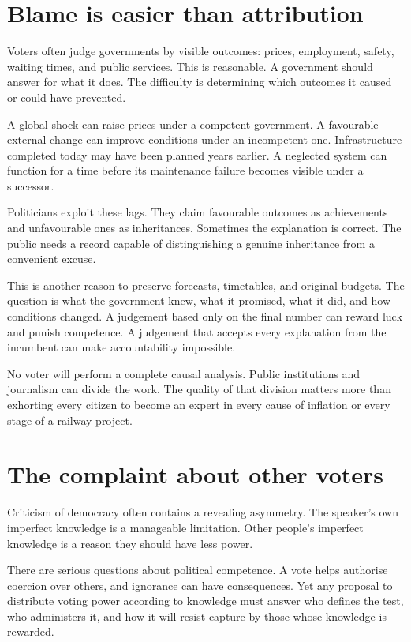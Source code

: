 \documentclass[12pt,a4paper]{book}
\begin{document}
\section*{Blame is easier than attribution}

Voters often judge governments by visible outcomes: prices, employment, safety, waiting times, and public services. This is reasonable. A government should answer for what it does. The difficulty is determining which outcomes it caused or could have prevented.

A global shock can raise prices under a competent government. A favourable external change can improve conditions under an incompetent one. Infrastructure completed today may have been planned years earlier. A neglected system can function for a time before its maintenance failure becomes visible under a successor.

Politicians exploit these lags. They claim favourable outcomes as achievements and unfavourable ones as inheritances. Sometimes the explanation is correct. The public needs a record capable of distinguishing a genuine inheritance from a convenient excuse.

This is another reason to preserve forecasts, timetables, and original budgets. The question is what the government knew, what it promised, what it did, and how conditions changed. A judgement based only on the final number can reward luck and punish competence. A judgement that accepts every explanation from the incumbent can make accountability impossible.

No voter will perform a complete causal analysis. Public institutions and journalism can divide the work. The quality of that division matters more than exhorting every citizen to become an expert in every cause of inflation or every stage of a railway project.

\section*{The complaint about other voters}

Criticism of democracy often contains a revealing asymmetry. The speaker's own imperfect knowledge is a manageable limitation. Other people's imperfect knowledge is a reason they should have less power.

There are serious questions about political competence. A vote helps authorise coercion over others, and ignorance can have consequences. Yet any proposal to distribute voting power according to knowledge must answer who defines the test, who administers it, and how it will resist capture by those whose knowledge is rewarded.
\end{document}
